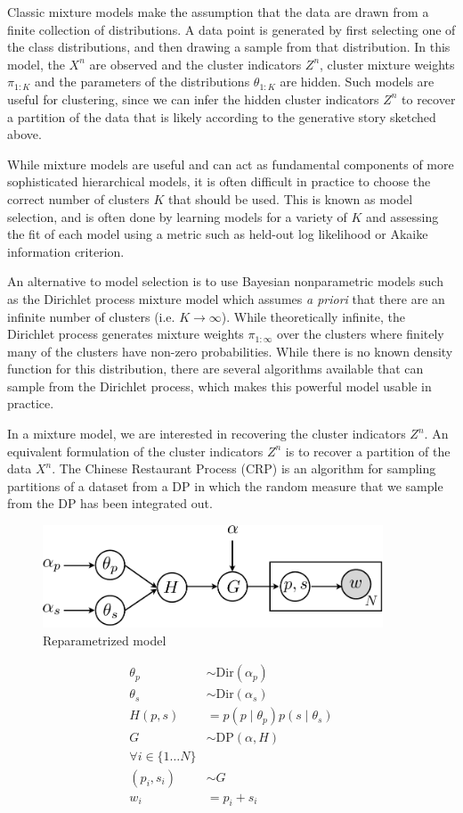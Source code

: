 Classic mixture models make the assumption that the data are drawn
from a finite collection of distributions. A data point is generated
by first selecting one of the class distributions, and then drawing a
sample from that distribution. In this model, the $X^n$ are observed
and the cluster indicators $Z^n$, cluster mixture weights $\pi_{1:K}$
and the parameters of the distributions $\theta_{1:K}$ are
hidden. Such models are useful for clustering, since we can infer the
hidden cluster indicators $Z^n$ to recover a partition of the data
that is likely according to the generative story sketched above.

While mixture models are useful and can act as fundamental components
of more sophisticated hierarchical models, it is often difficult in
practice to choose the correct number of clusters $K$ that should be
used. This is known as model selection, and is often done by learning
models for a variety of $K$ and assessing the fit of each model using
a metric such as held-out log likelihood or Akaike information
criterion.

An alternative to model selection is to use Bayesian nonparametric
models such as the Dirichlet process mixture model \cite{antoniak1974}
which assumes \textit{a priori} that there are an infinite number of
clusters (i.e. $K \to \infty$). While theoretically infinite, the
Dirichlet process generates mixture weights $\pi_{1:\infty}$ over the
clusters where finitely many of the clusters have non-zero
probabilities. While there is no known density function for this
distribution, there are several algorithms available that can sample
from the Dirichlet process, which makes this powerful model usable in
practice.

In a mixture model, we are interested in recovering the cluster
indicators $Z^n$. An equivalent formulation of the cluster indicators
$Z^n$ is to recover a partition of the data $X^n$. The Chinese
Restaurant Process (CRP) is an algorithm for sampling partitions of a
dataset from a DP in which the random measure that we sample from the
DP has been integrated out.

\begin{figure}[h]
\centering
\includegraphics[width=0.9\textwidth]{fig/v2}
\caption{Reparametrized model}
\label{fig:v1}
\end{figure}

\begin{align*}
\theta_p & \sim \text{Dir}(\alpha_p) \\
\theta_s & \sim \text{Dir}(\alpha_s) \\
H(p, s) & = p(p \mid \theta_p) p(s \mid \theta_s) \\
G & \sim \text{DP}\left(\alpha, H\right)\\
\forall i \in \{1 \dots N\} \\
(p_i, s_i) & \sim G \\
w_i & = p_i+s_i
\end{align*}
